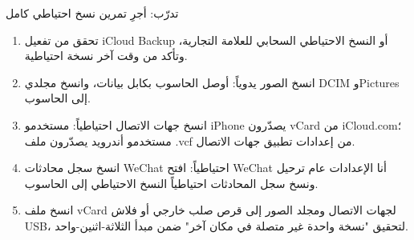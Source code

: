 \begin{tcbpractice}{تدرّب: أجرِ تمرين نسخ احتياطي كامل}
\begin{enumerate}
  \item تحقق من تفعيل iCloud Backup أو النسخ الاحتياطي السحابي للعلامة التجارية، وتأكد من وقت آخر نسخة احتياطية.
  \item انسخ الصور يدوياً: أوصل الحاسوب بكابل بيانات، وانسخ مجلدي DCIM وPictures إلى الحاسوب.
  \item انسخ جهات الاتصال احتياطياً: مستخدمو iPhone يصدّرون vCard من iCloud.com؛ مستخدمو أندرويد يصدّرون ملف .vcf من إعدادات تطبيق جهات الاتصال.
  \item انسخ سجل محادثات WeChat احتياطياً: افتح WeChat أنا الإعدادات عام ترحيل ونسخ سجل المحادثات احتياطياً النسخ الاحتياطي إلى الحاسوب.
  \item انسخ ملف vCard لجهات الاتصال ومجلد الصور إلى قرص صلب خارجي أو فلاش USB، لتحقيق "نسخة واحدة غير متصلة في مكان آخر" ضمن مبدأ الثلاثة-اثنين-واحد.
\end{enumerate}

\end{tcbpractice}

